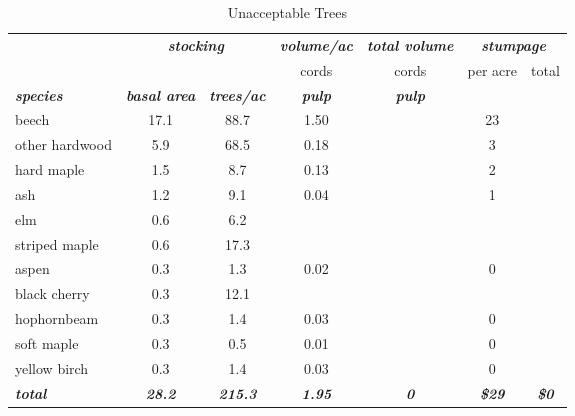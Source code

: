 \documentclass[landscape]{article}
\begin{document}
\begin{table}[H]

\caption{\label{tab:unnamed-chunk-15}Unacceptable Trees}
\fontsize{10}{12}\selectfont
\begin{tabular}[t]{lcccccc}
\toprule
\multicolumn{1}{c}{\em{\textbf{ }}} & \multicolumn{2}{c}{\em{\textbf{stocking}}} & \multicolumn{1}{c}{\em{\textbf{volume/ac }}} & \multicolumn{1}{c}{\em{\textbf{total volume}}} & \multicolumn{2}{c}{\em{\textbf{stumpage}}} \\
\cmidrule(l{3pt}r{3pt}){2-3} \cmidrule(l{3pt}r{3pt}){4-4} \cmidrule(l{3pt}r{3pt}){5-5} \cmidrule(l{3pt}r{3pt}){6-7}
\multicolumn{3}{c}{ } & \multicolumn{1}{c}{cords} & \multicolumn{1}{c}{cords} & \multicolumn{1}{c}{per acre} & \multicolumn{1}{c}{total} \\
\cmidrule(l{3pt}r{3pt}){4-4} \cmidrule(l{3pt}r{3pt}){5-5} \cmidrule(l{3pt}r{3pt}){6-6} \cmidrule(l{3pt}r{3pt}){7-7}
\rowcolor[HTML]{DCDCDC}  \em{\textbf{species}} & \em{\textbf{basal area}} & \em{\textbf{trees/ac}} & \em{\textbf{pulp}} & \em{\textbf{pulp}} & \em{\textbf{ }} & \em{\textbf{ }}\\
\midrule
\rowcolor{gray!6}  beech & 17.1 & 88.7 & 1.50 &  & 23 & \\
 
other hardwood & 5.9 & 68.5 & 0.18 &  & 3 & \\
 
\rowcolor{gray!6}  hard maple & 1.5 & 8.7 & 0.13 &  & 2 & \\
 
ash & 1.2 & 9.1 & 0.04 &  & 1 & \\
 
\rowcolor{gray!6}  elm & 0.6 & 6.2 &  &  &  & \\
 
striped maple & 0.6 & 17.3 &  &  &  & \\
 
\rowcolor{gray!6}  aspen & 0.3 & 1.3 & 0.02 &  & 0 & \\
 
black cherry & 0.3 & 12.1 &  &  &  & \\
 
\rowcolor{gray!6}  hophornbeam & 0.3 & 1.4 & 0.03 &  & 0 & \\
 
soft maple & 0.3 & 0.5 & 0.01 &  & 0 & \\
 
\rowcolor{gray!6}  yellow birch & 0.3 & 1.4 & 0.03 &  & 0 & \\
 
\rowcolor[HTML]{DCDCDC}  \em{\textbf{total}} & \em{\textbf{28.2}} & \em{\textbf{215.3}} & \em{\textbf{1.95}} & \em{\textbf{0}} & \em{\textbf{\$29}} & \em{\textbf{\$0}}\\
\bottomrule
\end{tabular}
\end{table}
\end{document}
